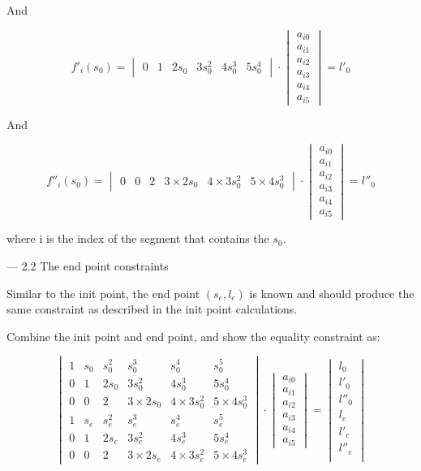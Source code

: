 \documentclass[a4paper,11pt]{article}  %
\begin{document}
And

$$
f'_i(s_0) = 
\begin{vmatrix} 0& 1 & 2s_0 & 3s_0^2 & 4s_0^3 &5 s_0^4 \end{vmatrix} 
\cdot 
\begin{vmatrix}  a_{i0} \\ a_{i1} \\ a_{i2} \\ a_{i3} \\ a_{i4} \\ a_{i5} \end{vmatrix} = l'_0
$$

And 

$$
f''_i(s_0) = 
\begin{vmatrix} 0&0& 2 & 3\times2s_0 & 4\times3s_0^2 & 5\times4s_0^3  \end{vmatrix} 
\cdot 
\begin{vmatrix}  a_{i0} \\ a_{i1} \\ a_{i2} \\ a_{i3} \\ a_{i4} \\ a_{i5} \end{vmatrix} = l''_0
$$

where i is the index of the segment that contains the $s_0$.

--- 2.2  The end point constraints

Similar to the init point, the end point $(s_e, l_e)$ is known and should produce the same constraint as described in the init point calculations. 


Combine the init point and end point, and show the equality constraint as: 


$$
\begin{vmatrix} 
 1 & s_0 & s_0^2 & s_0^3 & s_0^4&s_0^5 \\
 0&1 & 2s_0 & 3s_0^2 & 4s_0^3 & 5s_0^4 \\
 0& 0&2 & 3\times2s_0 & 4\times3s_0^2 & 5\times4s_0^3  \\
 1 & s_e & s_e^2 & s_e^3 & s_e^4&s_e^5 \\
 0&1 & 2s_e & 3s_e^2 & 4s_e^3 & 5s_e^4 \\
 0& 0&2 & 3\times2s_e & 4\times3s_e^2 & 5\times4s_e^3  
 \end{vmatrix} 
 \cdot 
 \begin{vmatrix}  a_{i0} \\ a_{i1} \\ a_{i2} \\ a_{i3} \\ a_{i4} \\ a_{i5} \end{vmatrix} 
 = 
 \begin{vmatrix}
 l_0\\
 l'_0\\
 l''_0\\
 l_e\\
 l'_e\\
 l''_e\\
 \end{vmatrix}
$$
\end{document}
